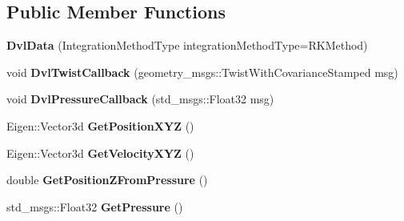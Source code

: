 \subsection*{Public Member Functions}
\begin{DoxyCompactItemize}
\item 
\mbox{\label{classnavigation_1_1DvlData_a0869dc4d839aed3b0362e084f1f4f637}} 
{\bfseries Dvl\+Data} (Integration\+Method\+Type integration\+Method\+Type=R\+K\+Method)
\item 
\mbox{\label{classnavigation_1_1DvlData_a3de3242a0cbea12329b09e266e900477}} 
void {\bfseries Dvl\+Twist\+Callback} (geometry\+\_\+msgs\+::\+Twist\+With\+Covariance\+Stamped msg)
\item 
\mbox{\label{classnavigation_1_1DvlData_ad8941460c960aadc7d995e2be367c8c8}} 
void {\bfseries Dvl\+Pressure\+Callback} (std\+\_\+msgs\+::\+Float32 msg)
\item 
\mbox{\label{classnavigation_1_1DvlData_adfcb95f8a4319806643b7c6e8e2c4a4a}} 
Eigen\+::\+Vector3d {\bfseries Get\+Position\+X\+YZ} ()
\item 
\mbox{\label{classnavigation_1_1DvlData_a39bab39003b8916544557a2ee6f20209}} 
Eigen\+::\+Vector3d {\bfseries Get\+Velocity\+X\+YZ} ()
\item 
\mbox{\label{classnavigation_1_1DvlData_a0fcf5be8a4f3393265351fffb810081b}} 
double {\bfseries Get\+Position\+Z\+From\+Pressure} ()
\item 
\mbox{\label{classnavigation_1_1DvlData_a54d3559339019627a33636157e369551}} 
std\+\_\+msgs\+::\+Float32 {\bfseries Get\+Pressure} ()
\end{DoxyCompactItemize}
